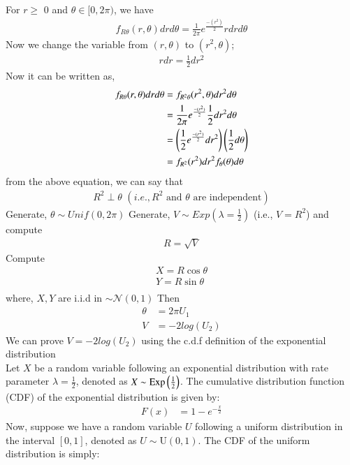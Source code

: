 \documentclass[article]{IEEEtran}
\theoremstyle{remark}
\begin{document}
  For $r\ge$ 0 and $\theta \in [0,2\pi)$, we have 
  \begin{align}
  	f_{R\theta}(r,\theta) drd\theta = \frac{1}{2\pi}e^{\frac{-(r^2)}{2}}rdrd\theta
  \end{align}
  Now we change the variable from $(r,\theta)$ to $(r^2,\theta)$;
  \begin{align}
  	rdr = \frac{1}{2}dr^2
  \end{align}
  Now it can be written as, 
  \begin{align}
  	f_{R\theta}(r,\theta)drd\theta &= f_{R^2\theta}(r^2,\theta)dr^2d\theta\\
  	&= \frac{1}{2\pi}e^{\frac{-(r^2)}{2}}\frac{1}{2}dr^2d\theta\\
  	&= \left(\frac{1}{2}e^{\frac{-(r^2)}{2}}dr^2\right)\left(\frac{1}{2}d\theta\right)\\
  	&= f_{R^2}(r^2)dr^2 f_{\theta}(\theta)d\theta
  \end{align}
  from the above equation, we can say that 
  \begin{align}
        R^2\perp\theta \,\, (i.e., R^2 \text{ and } \theta \text{ are independent})
  \end{align}
  Generate, $\theta \sim Unif(0,2\pi)$ 
  Generate, $V \sim Exp(\lambda = \frac{1}{2})$ (i.e., $V = R^2$) and compute 
  \begin{align}
        R=\sqrt{V}
  \end{align}
  Compute 
  \begin{align}
        X = R\cos\theta\\
        Y = R\sin\theta\\
  \end{align}
  where, $X,Y$ are i.i.d in $\sim \mathcal{N}(0,1)$
  Then  
  \begin{align}
        \theta &= 2\pi U_1\\
        V &= -2log(U_2)
  \end{align}
  We can prove $V = -2log(U_2)$ using the c.d.f definition of the exponential distribution\\
  Let $X$ be a random variable following an exponential distribution with rate parameter $\lambda = \frac{1}{2}$, denoted as $X \sim \text{Exp}\left(\frac{1}{2}\right)$. The cumulative distribution function (CDF) of the exponential distribution is given by:
\begin{align}
F(x) &= 1 - e^{-\frac{x}{2}}
\end{align}
Now, suppose we have a random variable $U$ following a uniform distribution in the interval $[0, 1]$, denoted as $U \sim \text{U}(0, 1)$. The CDF of the uniform distribution is simply:
\end{document}
